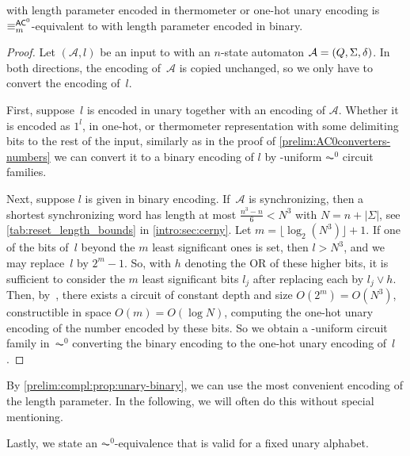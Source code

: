 \begin{proposition}
	\label{prelim:compl:prop:unary-binary}
	\DFASWS with length parameter encoded in thermometer or one-hot unary
	encoding is $\equiv_m^{\textup{\textsf{AC}}^0}$-equivalent to \DFASWS 
	with length parameter encoded in binary.
\end{proposition}
\begin{proof}
	Let $(\mathcal A, l)$ be an input to \DFASWS
	with an $n$-state automaton $\mathcal A = (Q, \Sigma, \delta)$.
	In both directions, the encoding of~$\mathcal A$ is copied unchanged,
	so we only have to convert the encoding of~$l$.
	
	First, suppose~$l$ is encoded in unary together with an encoding of $\mathcal A$.
	Whether it is encoded as $1^l$, in one-hot, or thermometer
	representation with some delimiting bits
	to the rest of the input, similarly as in
	the proof of \cref{prelim:AC0converters-numbers}
	we can convert it to a binary encoding of $l$ by \LOGSPACE-uniform $\AC^0$ circuit families.
	
	Next, suppose $l$ is given in binary encoding.
	If~$\mathcal A$ is synchronizing,
	then a shortest synchronizing word has length at most
	$\frac{n^3 - n}{6} < N^3$ with $N = n + |\Sigma|$,
	see \cref{tab:reset_length_bounds} in \cref{intro:sec:cerny}.
	Let $m = \lfloor \log_2(N^3) \rfloor + 1$.
	If one of the bits of~$l$ beyond the $m$ least significant ones is set,
	then $l > N^3$, and we may replace~$l$ by $2^m - 1$.
	So, with $h$ denoting the {\sc OR} of these higher bits,
	it is sufficient to consider the $m$ least significant bits $l_j$
	after replacing each by $l_j \lor h$.
	Then, by~,
	there exists a circuit of constant depth and size $O(2^m) = O(N^3)$,
	constructible in space $O(m) = O(\log N)$,
	computing the one-hot unary encoding of
	the number encoded by these bits.
	So we obtain a \LOGSPACE-uniform circuit family in~$\AC^0$
	converting the binary encoding to the one-hot unary encoding of~$l$.
\end{proof}

By \cref{prelim:compl:prop:unary-binary},
we can use the most convenient encoding of the length parameter. 
In the following, we will often do this without special mentioning.

Lastly, we state an $\AC^0$-equivalence that is valid for a fixed unary alphabet.

